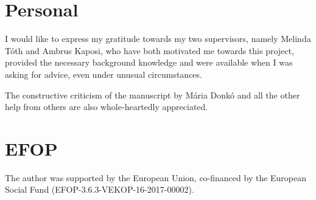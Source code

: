 \documentclass[runningheads,a4paper]{report}
\theoremstyle{definition}
\begin{document}
\section{Personal}
{\Large
    I would like to express my gratitude towards my two supervisors, namely Melinda Tóth and Ambrus Kaposi, who have both motivated me towards this project, provided the necessary background knowledge and were available when I was asking for advice, even under unusual circumstances.

    The constructive criticism of the manuscript by Mária Donkó and all the other help from others are also whole-heartedly appreciated.
}

\section{EFOP}
{\Large
    The author was supported by the European Union, co-financed by the European Social Fund (EFOP-3.6.3-VEKOP-16-2017-00002).
}

\newpage
{}


  
% 


{}




\end{document}
